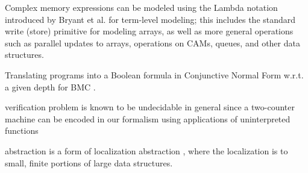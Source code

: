 
Complex memory expressions  can  be  modeled  using  the  Lambda  notation  introduced
by Bryant et al. \cite{bryant2002modeling} for term-level modeling; this includes the
standard write (store) primitive for modeling arrays, as well
as more general operations such as parallel updates to arrays,
operations on CAMs, queues, and other data structures.
\linebreak
\linebreak

Translating programs into a Boolean
formula in Conjunctive Normal Form w.r.t. a given depth for BMC \cite{cytron1991efficiently, angeletti2010}.
\linebreak
\linebreak

verification problem is known to  be  undecidable  in  general  since  a
two-counter machine can be encoded in our formalism using
applications  of  uninterpreted  functions \cite{isles1998computing}
\linebreak
\linebreak

abstraction is a form of localization abstraction \cite{kurshan1994automata},
where the localization is to small, finite portions of large data
structures.
\linebreak
\linebreak


